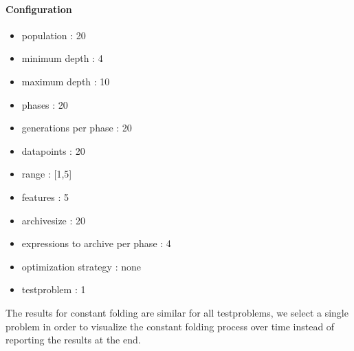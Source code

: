 \paragraph{Configuration}
\begin{itemize}
\item population : 20
\item minimum depth : 4
\item maximum depth : 10
\item phases : 20
\item generations per phase : 20
\item datapoints : 20
\item range : [1,5]
\item features : 5
\item archivesize : 20
\item expressions to archive per phase : 4
\item optimization strategy : none
\item testproblem : 1
\end{itemize}
The results for constant folding are similar for all testproblems, we select a single problem in order to visualize the constant folding  process over time instead of reporting the results at the end.
